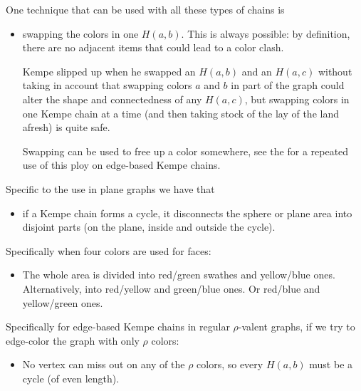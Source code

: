 \documentclass[12pt]{article}
\begin{document}
One technique that can be used with all these types of chains is
%
\begin{itemize}

\item swapping the colors in one $H(a,b)$. This is always possible:
      by definition, there are no adjacent items that could
      lead to a color clash.

      Kempe slipped up when he swapped an $H(a,b)$ and an $H(a,c)$ without
      taking in account that swapping colors $a$ and $b$ in part of the
      graph could alter the shape and connectedness of any $H(a,c)$, but
      swapping colors in one Kempe chain at a time (and then taking stock of
      the lay of the land afresh) is quite safe.

      Swapping can be used to free up a color somewhere, see the
       for a repeated use
      of this ploy on edge-based Kempe chains.

\end{itemize}
%
Specific to the use in plane graphs we have that
%
\begin{itemize}

\item if a Kempe chain forms a cycle, it disconnects the sphere or plane area
      into disjoint parts (on the plane, inside and outside the cycle).

\end{itemize}
%
Specifically when four colors are used for faces:
%
\begin{itemize}

\item The whole area is divided into red/green swathes and yellow/blue ones.
      Alternatively, into red/yellow and green/blue ones. Or red/blue and
      yellow/green ones.

\end{itemize}
%
Specifically for edge-based Kempe chains in regular $\rho$-valent graphs, if
we try to edge-color the graph with only $\rho$ colors:
%
\begin{itemize}

\item No vertex can miss out on any of the $\rho$ colors, so every $H(a,b)$
      must be a cycle (of even length).

\end{itemize}
\end{document}

